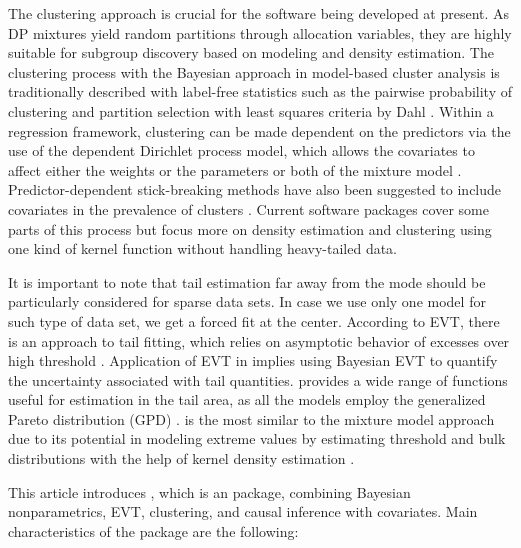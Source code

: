 \documentclass[article]{jss}\usepackage[]{graphicx}\usepackage[]{xcolor}
\begin{document}
The clustering approach is crucial for the software being developed at present.
As DP mixtures yield random partitions through allocation variables,
they are highly suitable for subgroup discovery based on modeling
and density estimation. The clustering process with the Bayesian
approach in model-based cluster analysis is traditionally described
with label-free statistics such as the pairwise probability of
clustering \citep{Binder1978} and partition selection with least
squares criteria by Dahl \citep{Dahl2006}. Within a regression
framework, clustering can be made dependent on the predictors via
the use of the dependent Dirichlet process model, which allows the
covariates to affect either the weights or the parameters or both
of the mixture model \citep{MacEachern1999, MacEachern2000, DeIorio2004, Quintana2022}.
Predictor-dependent stick-breaking methods have also been suggested
to include covariates in the prevalence of clusters
\citep{Ren2011}. Current software packages cover some parts of this
process but focus more on density estimation and clustering using
one kind of kernel function without handling heavy-tailed data.

It is important to note that tail estimation far away from the mode should be particularly considered for sparse data sets. In case we use only one model for such type of data set, we get a forced fit at the center. According to EVT, there is an approach to tail fitting, which relies on asymptotic behavior of excesses over high threshold
\citep{BalkemaDeHaan1974,Pickands1975,Coles2001}. Application of EVT in  implies using Bayesian EVT to quantify the uncertainty associated with tail quantities.  provides a wide range of functions useful for estimation in the tail area, as all the models employ the generalized Pareto distribution (GPD)
\citep{POT_pkg}.  is the most similar to the mixture model approach due to its potential in modeling extreme values by estimating threshold and bulk distributions with the help of kernel density estimation \citep{evmix_pkg}.

This article introduces , which is an  package,
combining Bayesian nonparametrics, EVT, clustering,
and causal inference with covariates. Main characteristics of the package are the following:
\end{document}
